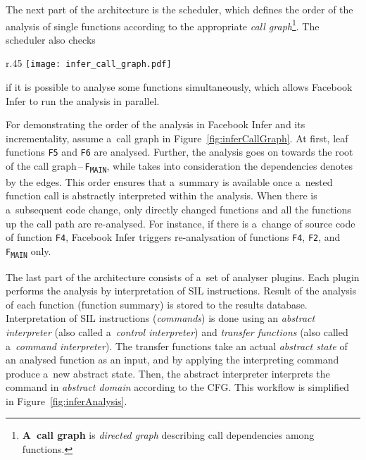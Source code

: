 The next part of the architecture is the scheduler, which defines the
order of the analysis of single functions according to the appropriate
\emph{call graph}\footnote{\textbf{A~call graph} is \emph{directed graph}
describing call dependencies among functions.}. The scheduler also checks
\begin{wrapfigure}{r}{.45 \linewidth}
    \centering
    \vspace{-.5em}
    \texttt{[image: infer\_call\_graph.pdf]}
    \caption{%
        A~call graph for an illustration of Facebook Infer's
        analysis process~\cite{inferAISlides}, \cite{excel2019FBInfer},
        \cite{projectPracticeMarcin2018}
    }
    \label{fig:inferCallGraph}
\end{wrapfigure}
if it is possible to analyse some functions simultaneously, which allows
Facebook Infer to run the analysis in parallel.

\begin{example}
    For demonstrating the order of the analysis in Facebook Infer and its
    incrementality, assume a~call graph in Figure~\ref{fig:inferCallGraph}.
    At first, leaf functions \texttt{F5} and \texttt{F6} are analysed. Further,
    the analysis goes on towards the root of the call
    graph\,--\,\texttt{F\textsubscript{MAIN}}, while takes into consideration
    the dependencies denotes by the edges. This order ensures that a~summary
    is available once a~nested function call is abstractly interpreted within
    the analysis. When there is a~subsequent code change, only directly changed
    functions and all the functions up the call path are re-analysed. For
    instance, if there is a~change of source code of function \texttt{F4},
    Facebook Infer triggers re-analysation of functions \texttt{F4},
    \texttt{F2}, and \texttt{F\textsubscript{MAIN}} only.
\end{example}

The last part of the architecture consists of a~set of analyser plugins.
Each plugin performs the analysis by interpretation of SIL instructions.
Result of the analysis of each function (function summary) is stored to
the results database. Interpretation of SIL instructions (\emph{commands})
is done using an \emph{abstract interpreter} (also called a~\emph{control
interpreter}) and \emph{transfer functions} (also called a~\emph{command
interpreter}). The transfer functions take an actual \emph{abstract state}
of an analysed function as an input, and by applying the interpreting command
produce a~new abstract state. Then, the abstract interpreter interprets the
command in \emph{abstract domain} according to the CFG. This workflow is
simplified in Figure~\ref{fig:inferAnalysis}.

